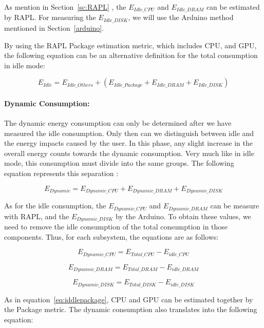 As mention in Section~\ref{sc:RAPL} , the $E_{Idle\_CPU}$ and $E_{Idle\_DRAM}$ can be estimated by RAPL. For measuring the $E_{Idle\_DISK}$, we will use the Arduino method mentioned in Section~\ref{arduino}.

By using the RAPL Package estimation metric, which includes CPU, and GPU, the following equation can be an alternative definition for the total consumption in idle mode:


\begin{equation}
\label{eq:iddlepackage}
E_{Idle} = E_{Idle\_Others} + ( E_{Idle\_Package} + E_{Idle\_DRAM} + E_{Idle\_DISK})
\end{equation}$
$

\paragraph{Dynamic Consumption:} The dynamic energy consumption can only be determined after we have measured the idle consumption. Only then can we distinguish between idle and the energy impacts caused by the user. In this phase, any slight increase in the overall energy counts towards the dynamic consumption. Very much like in idle mode, this consumption must divide into the same groups. The following equation represents this separation :

\begin{equation}
E_{Dynamic} = E_{Dynamic\_CPU} + E_{Dynamic\_DRAM} + E_{Dynamic\_DISK}
\end{equation}$
$

As for the idle consumption, the  $E_{Dynamic\_CPU}$ and $E_{Dynamic\_DRAM}$  can be measure with RAPL, and the  $E_{Dynamic\_DISK}$ by the Arduino. To obtain these values, we need to remove the idle consumption of the total consumption in those components. Thus, for each subsystem, the equations are as follows:


\begin{equation}
E_{Dynamic\_CPU} =  E_{Total\_CPU} - E_{idle\_CPU}
\end{equation}$
$

\begin{equation}
E_{Dynamic\_DRAM} =  E_{Total\_DRAM} - E_{idle\_DRAM}
\end{equation}$
$

\begin{equation}
E_{Dynamic\_DISK} =  E_{Total\_DISK} - E_{idle\_DISK}
\end{equation}$
$


As in equation~\ref{eq:iddlepackage}, CPU and GPU can be estimated together by the Package metric. The dynamic consumption also translates into the following equation:

